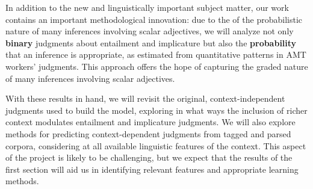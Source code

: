 \documentclass[10pt]{article}
\begin{document}
In addition to the new and linguistically important subject matter, our work contains an important methodological innovation: due to the of the probabilistic nature of many inferences involving scalar adjectives, we will analyze not only \textbf{binary} judgments about entailment and implicature but also the \textbf{probability} that an inference is appropriate, as estimated from quantitative patterns in AMT workers' judgments. This approach offers the hope of capturing the graded nature of many inferences involving scalar adjectives.

With these results in hand, we will revisit the original, context-independent judgments used to build the model, exploring in what ways the inclusion of richer context modulates entailment and implicature judgments. We will also explore methods for predicting context-dependent judgments from tagged and parsed corpora, considering at all available linguistic features of the context. This aspect of the project is likely to be challenging, but we expect that the results of the first section will aid us in identifying relevant features and appropriate learning methods. 
\end{document}
